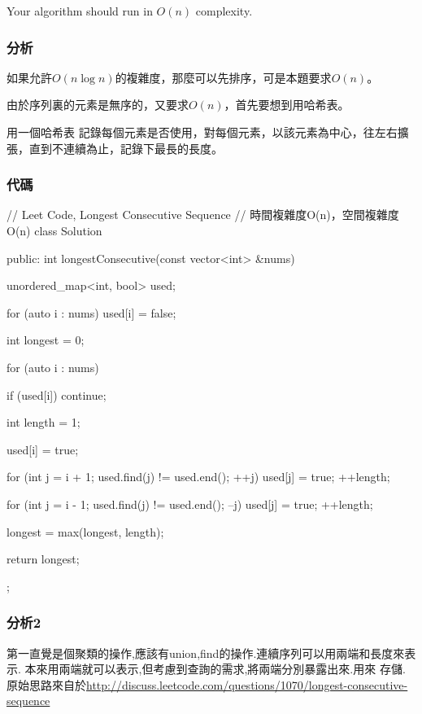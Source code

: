 Your algorithm should run in $O(n)$ complexity.


\subsubsection{分析}
如果允許$O(n \log n)$的複雜度，那麼可以先排序，可是本題要求$O(n)$。

由於序列裏的元素是無序的，又要求$O(n)$，首先要想到用哈希表。

用一個哈希表 記錄每個元素是否使用，對每個元素，以該元素為中心，往左右擴張，直到不連續為止，記錄下最長的長度。


\subsubsection{代碼}
\begin{Code}
// Leet Code, Longest Consecutive Sequence
// 時間複雜度O(n)，空間複雜度O(n)
class Solution {
public:
    int longestConsecutive(const vector<int> &nums) {
        unordered_map<int, bool> used;

        for (auto i : nums) used[i] = false;

        int longest = 0;

        for (auto i : nums) {
            if (used[i]) continue;

            int length = 1;

            used[i] = true;

            for (int j = i + 1; used.find(j) != used.end(); ++j) {
                used[j] = true;
                ++length;
            }

            for (int j = i - 1; used.find(j) != used.end(); --j) {
                used[j] = true;
                ++length;
            }

            longest = max(longest, length);
        }

        return longest;
    }
};
\end{Code}

\subsubsection{分析2}
第一直覺是個聚類的操作,應該有union,find的操作.連續序列可以用兩端和長度來表示.
本來用兩端就可以表示,但考慮到查詢的需求,將兩端分別暴露出來.用來
存儲.原始思路來自於\url{http://discuss.leetcode.com/questions/1070/longest-consecutive-sequence}

